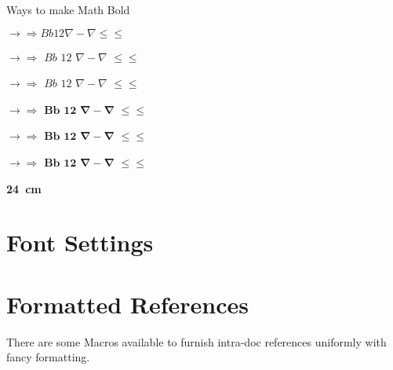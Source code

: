 \npi
Ways to make Math Bold

$\rightarrow\Rightarrow Bb12∇-\nabla \leq\leqslant$

{\boldmath$\rightarrow\Rightarrow$}
{\boldmath$Bb$}
{\boldmath$12$}
{\boldmath$∇-\nabla$}
{\boldmath$\leq\leqslant$}

{$\rightarrow\Rightarrow$}
{$Bb$}
{$12$}
{$∇-\nabla$}
{$\leq\leqslant$}

$\boldsymbol{\rightarrow\Rightarrow}$
$\boldsymbol{Bb}$
$\boldsymbol{12}$
$\boldsymbol{∇-\nabla}$
$\boldsymbol{\leq\leqslant}$

$\mathbf{\rightarrow\Rightarrow}$
$\mathbf{Bb}$
$\mathbf{12}$
$\mathbf{∇-\nabla}$
$\mathbf{\leq\leqslant}$

$\symbf{\rightarrow\Rightarrow}$
$\symbf{Bb}$
$\symbf{12}$
$\symbf{∇-\nabla}$
$\symbf{\leq\leqslant}$

{\bfseries\boldmath\qty[detect-weight=true,detect-all=true]{24}{\centi\meter}}







\section{Font Settings}

%







\section{Formatted References}

There are some Macros available to furnish intra-doc references uniformly with fancy formatting.

